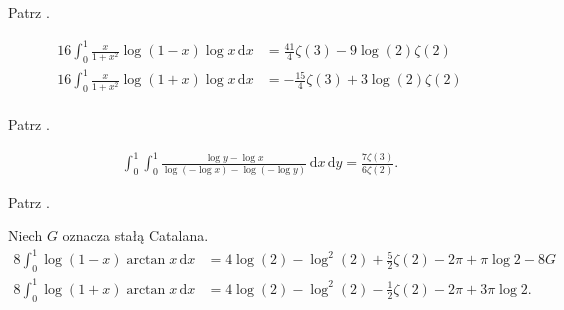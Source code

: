 \begin{solution}
    Patrz \cite[s. 8]{valean19}.
\end{solution}


\begin{problem_with_solution}
    \label{valean_1_14}%
    \begin{align}
        16 \int_0^1 \frac{x}{1+ x^2} \log (1 - x) \log x \,\mathrm{d}x & = \frac{41}{4} \zeta(3) - 9 \log(2) \zeta(2) \\
        16 \int_0^1 \frac{x}{1+ x^2} \log (1 + x) \log x \,\mathrm{d}x & = -\frac{15}{4} \zeta(3) + 3 \log(2) \zeta(2) \\
    \end{align} 
\end{problem_with_solution}


\begin{solution}
    Patrz \cite[s. 8]{valean19}.
\end{solution}

\begin{problem_with_solution}
    \label{valean_1_17}%
    \begin{align}
        \int_0^1 \int_0^1 \frac{\log y - \log x}{\log (- \log x) - \log(- \log y)} \,\mathrm{d}x \,\mathrm{d}y = \frac{7 \zeta(3)}{6 \zeta (2)}.
    \end{align} 
\end{problem_with_solution}


\begin{solution}
    Patrz \cite[s. 10]{valean19}.
\end{solution}

\begin{problem_with_solution}
    \label{valean_1_18}%
    Niech $G$ oznacza stałą Catalana.
    \begin{align}
        8 \int_0^1 \log (1 - x) \arctan x \,\mathrm{d}x & = 4 \log (2) - \log^2 (2) + \frac 5 2 \zeta(2) - 2 \pi + \pi \log 2 - 8 G \\
        8 \int_0^1 \log (1 + x) \arctan x \,\mathrm{d}x & = 4 \log (2) - \log^2 (2) - \frac 1 2 \zeta(2) - 2 \pi + 3 \pi \log 2.
    \end{align} 
\end{problem_with_solution}

